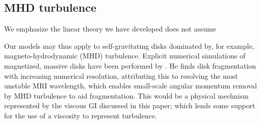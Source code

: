 
\subsection{MHD turbulence}\label{MHD}%
We emphasize the linear theory we have developed does not assume 






Our models may thus apply to self-gravitating disks dominated by, for
example, magneto-hydrodynamic (MHD) turbulence.   
Explicit numerical simulations of magnetized, massive disks have been performed 
by \cite{fromang05}. He finds disk fragmentation with increasing numerical
resolution, attributing this to resolving the most unstable MRI
wavelength, which enables small-scale angular momentum removal by MHD
turbulence to aid fragmentation. %
This would be a physical mechnism represented by the viscous GI
discussed in this paper; which lends some support for  
the use of a viscosity to represent turbulence.    


